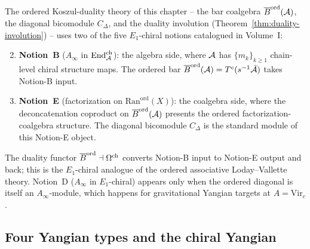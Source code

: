 \begin{convention}
\label{conv:ordered-kd-core-five-notions}
The ordered Koszul-duality theory of this chapter -- the bar coalgebra
$\overline{B}^{\mathrm{ord}}(\mathcal{A})$, the diagonal bicomodule $C_\Delta$, and the
duality involution (Theorem~\ref{thm:duality-involution}) -- uses
two of the five $E_1$-chiral notions catalogued in Volume~I:
\begin{enumerate}[label=\textup{(\Alph*)}]
\setcounter{enumi}{1}
\item \textbf{Notion~B} ($A_\infty$ in $\mathrm{End}^{\mathrm{ch}}_{\mathcal{A}}$):
the algebra side, where $\mathcal{A}$ has $\{m_k\}_{k\ge 1}$ chain-level
chiral structure maps. The ordered bar
$\overline{B}^{\mathrm{ord}}(\mathcal{A}) = T^c(s^{-1}\bar{\mathcal{A}})$ takes Notion-B input.
\setcounter{enumi}{4}
\item \textbf{Notion~E} (factorization on
$\mathrm{Ran}^{\mathrm{ord}}(X)$): the coalgebra side, where the
deconcatenation coproduct on $\overline{B}^{\mathrm{ord}}(\mathcal{A})$ presents the
ordered factorization-coalgebra structure. The diagonal
bicomodule $C_\Delta$ is the standard module of this Notion-E
object.
\end{enumerate}
The duality functor $\overline{B}^{\mathrm{ord}} \dashv \Omega^{\mathrm{ch}}$ converts Notion-B
input to Notion-E output and back; this is the $E_1$-chiral analogue
of the ordered associative Loday--Vallette theory. Notion~D
($A_\infty$ in $E_1$-chiral) appears only when the ordered
diagonal is itself an $A_\infty$-module, which happens for
gravitational Yangian targets at $A = \mathrm{Vir}_c$.
\end{convention}

\subsection{Four Yangian types and the chiral Yangian}
\label{subsec:ordered-kd-core-yangian-types}

